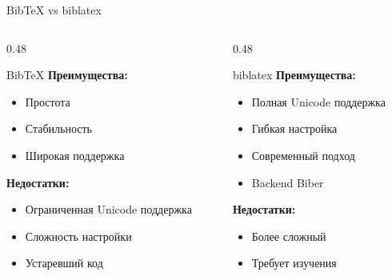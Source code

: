 \documentclass[aspectratio=169, 12pt]{beamer}
\begin{document}
\begin{frame}{BibTeX vs biblatex}
  \begin{columns}[T]
    \begin{column}{0.48\textwidth}
      \begin{block}{BibTeX}
        \textbf{Преимущества:}
        \begin{itemize}
          \item Простота
          \item Стабильность
          \item Широкая поддержка
        \end{itemize}
        
        \vspace{0.3cm}
        
        \textbf{Недостатки:}
        \begin{itemize}
          \item Ограниченная Unicode поддержка
          \item Сложность настройки
          \item Устаревший код
        \end{itemize}
      \end{block}
    \end{column}
    
    \begin{column}{0.48\textwidth}
      \begin{exampleblock}{biblatex}
        \textbf{Преимущества:}
        \begin{itemize}
          \item Полная Unicode поддержка
          \item Гибкая настройка
          \item Современный подход
          \item Backend Biber
        \end{itemize}
        
        \vspace{0.3cm}
        
        \textbf{Недостатки:}
        \begin{itemize}
          \item Более сложный
          \item Требует изучения
        \end{itemize}
      \end{exampleblock}
    \end{column}
  \end{columns}
\end{frame}
\end{document}

